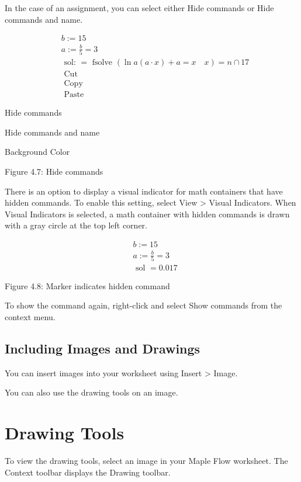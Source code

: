 In the case of an assignment, you can select either Hide commands or Hide commands and name.

\begin{equation*}
\begin{aligned}
& b:=15 \\
& a:=\frac{b}{5}=3 \\
& \text { sol: }=\text { fsolve }(\ln a(a \cdot x)+a=x \quad x)=n \cap 17 \\
& \text { Cut } \\
& \text { Copy } \\
& \text { Paste }
\end{aligned}
\end{equation*}

Hide commands

Hide commands and name

Background Color

Figure 4.7: Hide commands

There is an option to display a visual indicator for math containers that have hidden commands. To enable this setting, select View > Visual Indicators. When Visual Indicators is selected, a math container with hidden commands is drawn with a gray circle at the top left corner.

\begin{equation*}
\begin{aligned}
& b:=15 \\
& a:=\frac{b}{5}=3 \\
& \text { sol }=0.017
\end{aligned}
\end{equation*}

Figure 4.8: Marker indicates hidden command

To show the command again, right-click and select Show commands from the context menu.

\subsection{Including Images and Drawings}
You can insert images into your worksheet using Insert > Image.

You can also use the drawing tools on an image.

\section{Drawing Tools}
To view the drawing tools, select an image in your Maple Flow worksheet. The Context toolbar displays the Drawing toolbar.

